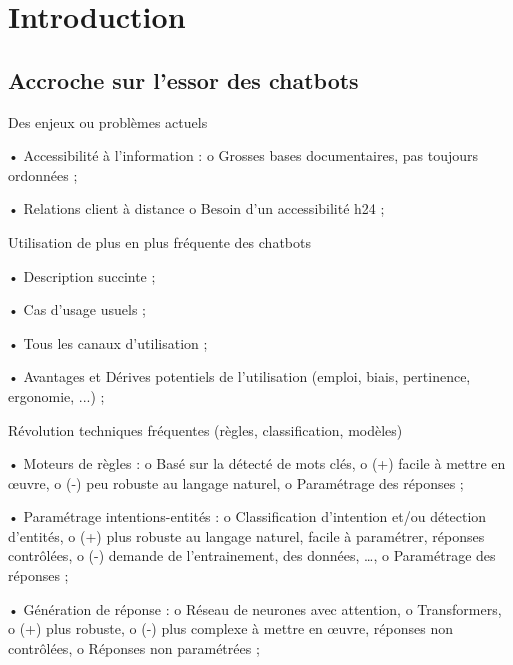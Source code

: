 \chapter*{Introduction}
    \label{chapter:INTRODUCTION}

    \section{Accroche sur l'essor des chatbots}

    \begin{todolist}
        \item Des enjeux ou problèmes actuels

            •	Accessibilité à l'information :
                o	Grosses bases documentaires, pas toujours ordonnées ;

            •	Relations client à distance
                o   Besoin d'un accessibilité h24 ;

        \item Utilisation de plus en plus fréquente des chatbots
        
            •   Description succinte ;

            •   Cas d'usage usuels ;

            •   Tous les canaux d'utilisation ;

            •   Avantages et Dérives potentiels de l'utilisation (emploi, biais, pertinence, ergonomie, ...) ;

        \item Révolution techniques fréquentes (règles, classification, modèles)

            •	Moteurs de règles :
                o	Basé sur la détecté de mots clés,
                o	(+) facile à mettre en œuvre,
                o	(-) peu robuste au langage naturel,
                o	Paramétrage des réponses ;

            •	Paramétrage intentions-entités :
                o	Classification d’intention et/ou détection d’entités,
                o	(+) plus robuste au langage naturel, facile à paramétrer, réponses contrôlées,
                o	(-) demande de l’entrainement, des données, …,
                o	Paramétrage des réponses ;

            •	Génération de réponse :
                o	Réseau de neurones avec attention,
                o	Transformers,
                o	(+) plus robuste,
                o	(-) plus complexe à mettre en œuvre, réponses non contrôlées,
                o	Réponses non paramétrées ;


\end{todolist}
